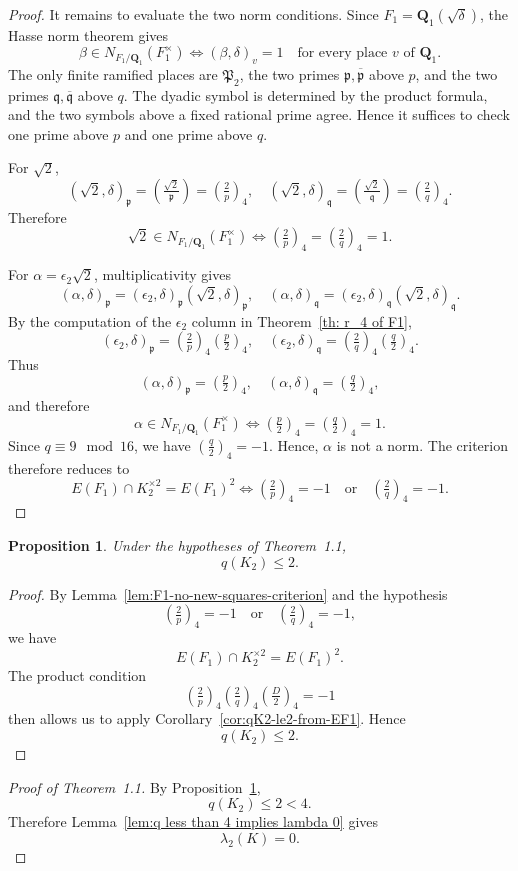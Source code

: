 \documentclass{article}
\numberwithin{equation}{section}
\theoremstyle{plain}  %
\newtheorem{proposition}{Proposition}[section]
\theoremstyle{definition}
\newcommand{\kron}[2]{\left( \tfrac{#1}{#2} \right)}
\newcommand{\fk}{\mathfrak }
\begin{document}
\begin{proof}
It remains to evaluate the two norm conditions. Since $F_1=\mathbf Q_1(\sqrt \delta)$, the Hasse norm theorem gives
$$
\beta \in N_{F_1/\mathbf Q_1}(F_1^\times) \iff (\beta,\delta)_v=1 \quad \text{for every place } v \text{ of } \mathbf Q_1.
$$
The only finite ramified places are $\fk P_2$, the two primes $\fk p,\overline{\fk p}$ above $p$, and the two primes $\fk q,\overline{\fk q}$ above $q$. The dyadic symbol is determined by the product formula, and the two symbols above a fixed rational prime agree. Hence it suffices to check one prime above $p$ and one prime above $q$.

For $\sqrt 2$,
$$
(\sqrt 2,\delta)_{\fk p}=\kron{\sqrt 2}{\fk p}=\kron{2}{p}_4, \quad (\sqrt 2,\delta)_{\fk q}=\kron{\sqrt 2}{\fk q}=\kron{2}{q}_4.
$$
Therefore
$$
\sqrt 2 \in N_{F_1/\mathbf Q_1}(F_1^\times) \iff \kron{2}{p}_4=\kron{2}{q}_4=1.
$$

For $\alpha=\epsilon_2\sqrt 2$, multiplicativity gives
$$
(\alpha,\delta)_{\fk p}=(\epsilon_2,\delta)_{\fk p}(\sqrt 2,\delta)_{\fk p}, \quad (\alpha,\delta)_{\fk q}=(\epsilon_2,\delta)_{\fk q}(\sqrt 2,\delta)_{\fk q}.
$$
By the computation of the $\epsilon_2$ column in Theorem~\ref{th: r_4 of F1},
$$
(\epsilon_2,\delta)_{\fk p}=\kron{2}{p}_4\kron{p}{2}_4, \quad (\epsilon_2,\delta)_{\fk q}=\kron{2}{q}_4\kron{q}{2}_4.
$$
Thus
$$
(\alpha,\delta)_{\fk p}=\kron{p}{2}_4, \quad (\alpha,\delta)_{\fk q}=\kron{q}{2}_4,
$$
and therefore
$$
\alpha \in N_{F_1/\mathbf Q_1}(F_1^\times) \iff \kron{p}{2}_4=\kron{q}{2}_4=1.
$$
Since $q \equiv 9 \mod {16}$, we have $\kron{q}{2}_4=-1$. Hence, $\alpha$ is not a norm. The criterion therefore reduces to
$$
E(F_1) \cap K_2^{\times 2}=E(F_1)^2 \iff \kron{2}{p}_4=-1 \quad \text{or} \quad \kron{2}{q}_4=-1.
$$
\end{proof}

\begin{proposition}\label{prop:qK2-le2}
Under the hypotheses of Theorem~1.1,
$$
q(K_2) \le 2.
$$
\end{proposition}

\begin{proof}
By Lemma~\ref{lem:F1-no-new-squares-criterion} and the hypothesis
$$
\kron{2}{p}_4=-1 \quad \text{or} \quad \kron{2}{q}_4=-1,
$$
we have
$$
E(F_1) \cap K_2^{\times 2}=E(F_1)^2.
$$
The product condition
$$
\kron{2}{p}_4\kron{2}{q}_4\kron{D}{2}_4=-1
$$
then allows us to apply Corollary~\ref{cor:qK2-le2-from-EF1}. Hence
$$
q(K_2) \le 2.
$$
\end{proof}

\begin{proof}[Proof of Theorem~1.1]
By Proposition~\ref{prop:qK2-le2},
$$
q(K_2) \le 2 < 4.
$$
Therefore Lemma~\ref{lem:q less than 4 implies lambda 0} gives
$$
\lambda_2(K)=0.
$$
\end{proof}
\end{document}
